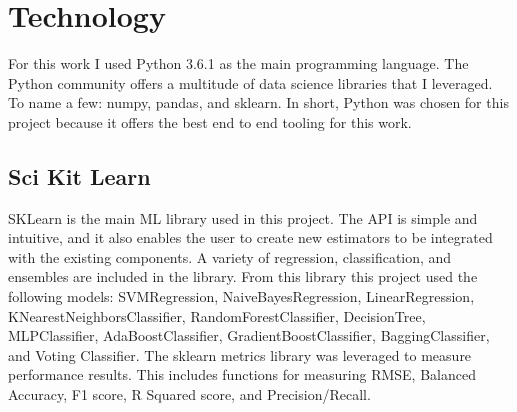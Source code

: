 \section{Technology}
\setlength{\parindent}{10ex}
For this work I used Python 3.6.1 as the main programming language.
The Python community offers a multitude of data science libraries that I leveraged.
To name a few: numpy, pandas, and sklearn.
In short, Python was chosen for this project because it offers the best end to end tooling for this work.

\subsection{Sci Kit Learn}
SKLearn is the main \ac{ML} library used in this project.
The \ac{API} is simple and intuitive, and it also enables the user to create new estimators to be integrated with the existing components.
A variety of regression, classification, and ensembles are included in the library.
From this library this project used the following models: SVMRegression, NaiveBayesRegression, LinearRegression, KNearestNeighborsClassifier, RandomForestClassifier, DecisionTree, MLPClassifier, AdaBoostClassifier, GradientBoostClassifier, BaggingClassifier, and Voting Classifier.
The sklearn metrics library was leveraged to measure performance results.
This includes functions for measuring \ac{RMSE}, Balanced Accuracy, F1 score, R Squared score, and Precision/Recall.
